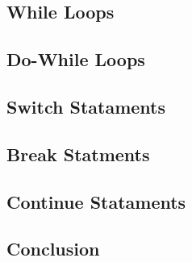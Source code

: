 \subsection{While Loops}

\subsection{Do-While Loops}

\subsection{Switch Stataments}

\subsection{Break Statments}

\subsection{Continue Stataments}

\subsection{Conclusion}
